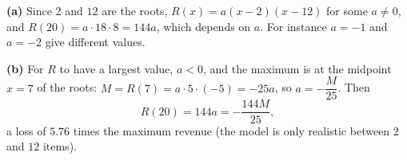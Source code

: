 \textbf{(a)} Since $2$ and $12$ are the roots, $R(x)=a(x-2)(x-12)$ for some $a\ne0$, and $R(20)=a\cdot18\cdot8=144a$, which depends on $a$. For instance $a=-1$ and $a=-2$ give different values.

\textbf{(b)} For $R$ to have a largest value, $a<0$, and the maximum is at the midpoint $x=7$ of the roots: $M=R(7)=a\cdot5\cdot(-5)=-25a$, so $a=-\dfrac M{25}$. Then
\[R(20)=144a=\boxed{-\dfrac{144M}{25}},\]
a loss of $5.76$ times the maximum revenue (the model is only realistic between $2$ and $12$ items).
